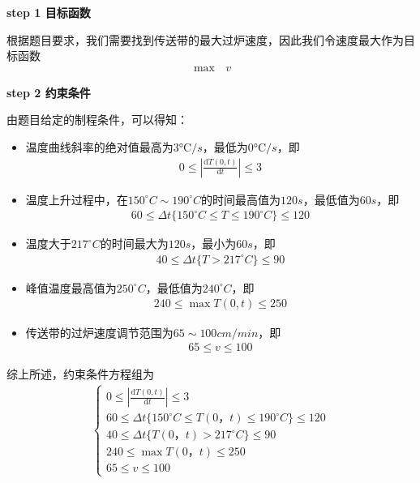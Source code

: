 \documentclass[../main.tex]{subfiles}
\begin{document}
 
\noindent \textbf{step 1 目标函数}
 \par 根据题目要求，我们需要找到传送带的最大过炉速度，因此我们令速度最大作为目标函数
 \begin{align}\label{6.1}
  \max\text{\ }v
 \end{align}

 \noindent \textbf{step 2 约束条件}
    \par  由题目给定的制程条件，可以得知：
  \begin{itemize}
    \item 温度曲线斜率的绝对值最高为$3°\text{C/}s$，最低为$0°\text{C/}s$，即
    \begin{align}\label{6.2}
      0\leq\left|\frac{\mathrm{d}T(0,t)}{\mathrm{d}t}\right|\leq 3
    \end{align}
    \item 温度上升过程中，在$150^{\circ}C\sim190^{\circ}C$的时间最高值为$120s$，最低值为$60s$，即
   \begin{align}\label{6.3}
    60\leq\Delta t\{ 150^{\circ}C\leq T\leq190^{\circ}C\}\leq120
   \end{align}
   \item 温度大于$217^{\circ}C$的时间最大为$120s$，最小为$60s$，即
   \begin{align}\label{6.5}
    40\leq\Delta t\{T > 217^{\circ}C\}\leq90 
   \end{align}
    \item 峰值温度最高值为$250^{\circ}C$，最低值为$240^{\circ}C$，即
    \begin{align}\label{6.4}
      240\leq\max T(0,t)\leq250
    \end{align}
    \item 传送带的过炉速度调节范围为$65\sim100 cm/min$，即
    \begin{align}\label{6.6}
      65\leq v\leq100
    \end{align}
  \end{itemize}
  \par 综上所述，约束条件方程组为
  \begin{align}\label{6.7}
    \left\{\begin{array}{l}
      0\leq\left|\frac{\mathrm{d}T(0,t)}{\mathrm{d}t}\right|\leq 3
    \\ 
      60\leq\Delta t\{ 150^{\circ}C\leq T(0，t)\leq190^{\circ}C\}\leq120
    \\
      40\leq\Delta t\{T(0，t) > 217^{\circ}C\}\leq90 
    \\
      240\leq\max T(0，t)\leq250
    \\
      65\leq v\leq100
    \end{array} \right.      
  \end{align}
\end{document}
